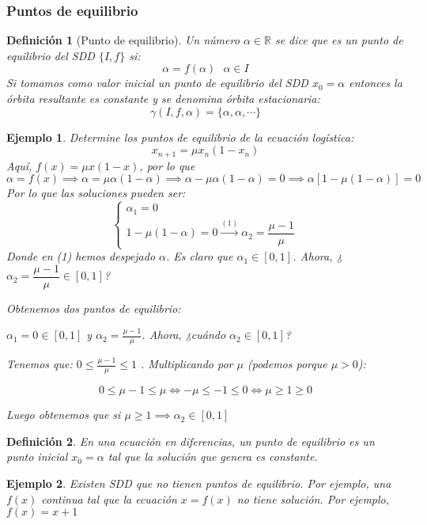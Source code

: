 \documentclass[11pt, a4paper, titlepage]{article}
\newcommand{\R}{\mathbb{R}}
\theoremstyle{theorem-style}
\theoremstyle{definition-style}
\newtheorem*{ndef}{Definición}
\theoremstyle{remark-style}
\theoremstyle{example-style}
\newtheorem*{ejemplo}{Ejemplo}
\begin{document}
\subsubsection{Puntos de equilibrio}
\begin{ndef}[Punto de equilibrio]
	Un número $\alpha \in \R$ se dice que es un punto de equilibrio del SDD $\{I,f\}$ si:
	\[
	\alpha = f(\alpha) \ \ \ \alpha \in I
	\]
	Si tomamos como valor inicial un punto de equilibrio del SDD $x_0 = \alpha$ entonces la órbita resultante es constante y se denomina órbita estacionaria:
	\[
	\gamma(I,f,\alpha) = \{\alpha, \alpha, \cdots\}
	\]
\end{ndef}
\begin{ejemplo}
	Determine los puntos de equilibrio de la ecuación logística:
	\[
	x_{n+1} = \mu x_n(1-x_n)
	\]
	Aquí, $f(x) = \mu x(1-x)$, por lo que
	 \[
	\alpha = f(x) \implies \alpha = \mu \alpha (1-\alpha) \implies \alpha - \mu \alpha(1-\alpha) = 0 \implies \alpha[1-\mu(1-\alpha)] = 0
	\]
	Por lo que las soluciones pueden ser:
	\[
	\begin{cases}
	\alpha_1 = 0\\
	1-\mu(1-\alpha) = 0 \xrightarrow{(1)} \alpha_2 = \dfrac{\mu -1}{\mu}
\end{cases}
	\]
	Donde en (1) hemos despejado $\alpha$. Es claro que $\alpha_1 \in [0,1]$. Ahora, ¿$\alpha_2=  \dfrac{\mu -1}{\mu} \in [0,1] $?
	

	Obtenemos dos puntos de equilibrio:

	$ \alpha_{1} = 0 \in [0,1] $ y $ \alpha_{2}= \frac{\mu - 1}{\mu} $. Ahora, ¿cuándo $\alpha_2\in [0,1] $?

	Tenemos que: $ 0 \leq \frac{\mu - 1}{\mu} \leq 1 $ . Multiplicando por $\mu$ (podemos porque $\mu > 0$):

	$$ 0 \leq \mu - 1 \leq \mu \Leftrightarrow -\mu \leq -1 \leq 0 \Leftrightarrow \mu \geq 1 \geq 0 $$

	Luego obtenemos que si $\mu \geq 1 \implies \alpha_{2} \in [0,1] $

\end{ejemplo}

\begin{ndef}
	En una ecuación en diferencias, un punto de equilibrio es un punto inicial $x_0= \alpha$ tal que la solución que genera es constante.
\end{ndef}

\begin{ejemplo}
	Existen SDD que no tienen puntos de equilibrio. Por ejemplo, una $f(x)$ continua tal que la ecuación $x = f(x)$ no tiene solución. Por ejemplo, $f(x) = x+1$
\end{ejemplo}
\end{document}
